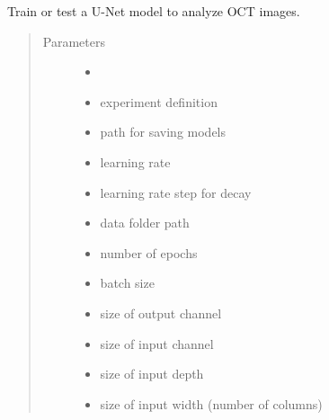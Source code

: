 \documentclass[letterpaper,10pt,english]{sphinxmanual}
\begin{document}
\begin{fulllineitems}
\label{\detokenize{index:train.main}}
Train or test a U-Net model to analyze OCT images.
\begin{quote}\begin{description}
\item[{Parameters}] \leavevmode\begin{itemize}
\item {} 
 \textendash{} 

\item {} 
 \textendash{} experiment definition

\item {} 
 \textendash{} path for saving models

\item {} 
 \textendash{} learning rate

\item {} 
 \textendash{} learning rate step for decay

\item {} 
 \textendash{} data folder path

\item {} 
 \textendash{} number of epochs

\item {} 
 \textendash{} batch size

\item {} 
 \textendash{} size of output channel

\item {} 
 \textendash{} size of input channel

\item {} 
 \textendash{} size of input depth

\item {} 
 \textendash{} size of input width (number of columns)


\end{itemize}
\end{description}
\end{quote}
\end{fulllineitems}
\end{document}
